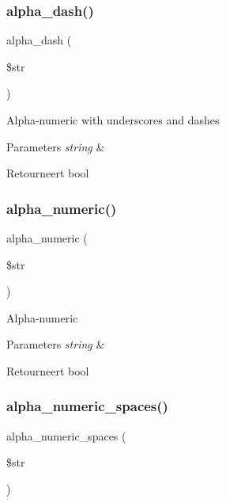 \subsubsection{\texorpdfstring{alpha\_dash()}{alpha\_dash()}}
{\footnotesize\ttfamily alpha\+\_\+dash (\begin{DoxyParamCaption}\item[{}]{\$str }\end{DoxyParamCaption})}

Alpha-\/numeric with underscores and dashes


\begin{DoxyParams}{Parameters}
{\em string} & \\
\hline
\end{DoxyParams}
\begin{DoxyReturn}{Retourneert}
bool 
\end{DoxyReturn}
\mbox{\label{class_c_i___form__validation_aa3b561d437be2774b1a6850ada97024a}} 
\subsubsection{\texorpdfstring{alpha\_numeric()}{alpha\_numeric()}}
{\footnotesize\ttfamily alpha\+\_\+numeric (\begin{DoxyParamCaption}\item[{}]{\$str }\end{DoxyParamCaption})}

Alpha-\/numeric


\begin{DoxyParams}{Parameters}
{\em string} & \\
\hline
\end{DoxyParams}
\begin{DoxyReturn}{Retourneert}
bool 
\end{DoxyReturn}
\mbox{\label{class_c_i___form__validation_a9c7e61a17f9ff3cbf176d7afab3b1555}} 
\subsubsection{\texorpdfstring{alpha\_numeric\_spaces()}{alpha\_numeric\_spaces()}}
{\footnotesize\ttfamily alpha\+\_\+numeric\+\_\+spaces (\begin{DoxyParamCaption}\item[{}]{\$str }\end{DoxyParamCaption})}

